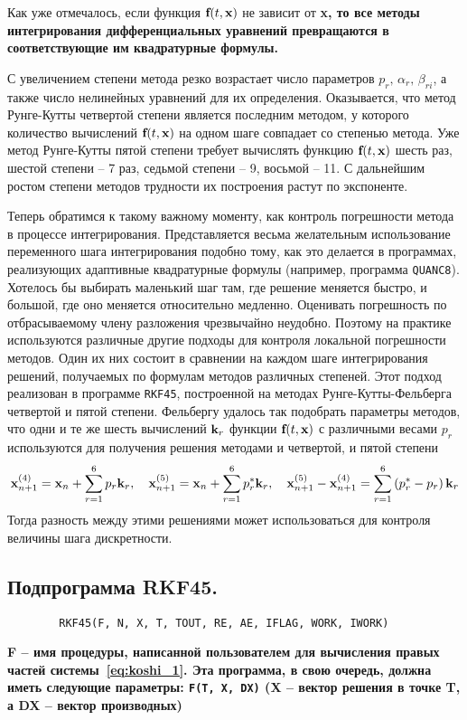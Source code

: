 \documentclass[../../calc-math-exam-2023.tex]{subfiles}
\begin{document}
    Как уже отмечалось, если функция $\bf{f}(t, \bf{x})$ не зависит от \bf{x}, то все методы интегрирования
    дифференциальных уравнений превращаются в соответствующие им квадратурные формулы.

    С увеличением степени метода резко возрастает число параметров $p_r, \, \alpha_r, \, \beta_{ri}$, а также число
    нелинейных уравнений для их определения. Оказывается, что метод Рунге-Кутты четвертой степени является последним
    методом, у которого количество вычислений $\bf{f}(t, \bf{x})$ на одном шаге совпадает со степенью метода. Уже метод
    Рунге-Кутты пятой степени требует вычислять функцию $\bf{f}(t, \bf{x})$ шесть раз, шестой степени -- 7 раз, седьмой
    степени -- 9, восьмой -- 11. С дальнейшим ростом степени методов трудности их построения растут по экспоненте.

    Теперь обратимся к такому важному моменту, как контроль погрешности метода в процессе интегрирования. Представляется
    весьма желательным использование переменного шага интегрирования подобно тому, как это делается в программах,
    реализующих адаптивные квадратурные формулы (например, программа \verb|QUANC8|). Хотелось бы выбирать маленький шаг
    там, где решение меняется быстро, и большой, где оно меняется относительно медленно. Оценивать погрешность по
    отбрасываемому члену разложения чрезвычайно неудобно. Поэтому на практике используются различные другие подходы для
    контроля локальной погрешности методов. Один их них состоит в сравнении на каждом шаге интегрирования решений,
    получаемых по формулам методов различных степеней. Этот подход реализован в программе \verb|RKF45|, построенной на
    методах Рунге-Кутты-Фельберга четвертой и пятой степени. Фельбергу удалось так подобрать параметры методов, что
    одни и те же шесть вычислений $\bf{k}_r$ функции $\bf{f}(t, \bf{x})$ с различными весами $p_r$ используются для
    получения решения методами и четвертой, и пятой степени
    \begin{equation*}
        \bf{x}_{n+1}^{(4)} = \bf{x}_n + \sum_{r=1}^{6} p_r \bf{k}_r, \quad \bf{x}_{n+1}^{(5)} = \bf{x}_n + \sum_{r=1}^{6} p_r^* \bf{k}_r,
        \quad \bf{x}_{n+1}^{(5)} - \bf{x}_{n+1}^{(4)} = \sum_{r=1}^{6} \left( p_r^* - p_r \right)\bf{k}_r
    \end{equation*}
    Тогда разность между этими решениями может использоваться для контроля величины шага дискретности.

    \subsection{Подпрограмма \textbf{RKF45}.}
    \begin{verbatim}
        RKF45(F, N, X, T, TOUT, RE, AE, IFLAG, WORK, IWORK)
    \end{verbatim}
    \bf{F} -- имя процедуры, написанной пользователем для вычисления правых частей системы~\eqref{eq:koshi_1}. Эта
    программа, в свою очередь, должна иметь следующие параметры: \verb|F(T, X, DX)| (\bf{X} -- вектор решения в точке \bf{T}, а \bf{DX} -- вектор производных)
\end{document}
